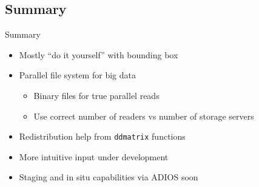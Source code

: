 \subsection{Summary}
\makesubcontentsslidessec


\begin{frame}
  \begin{block}{Summary}
    \begin{itemize}
    \item Mostly ``do it yourself'' with bounding box
    \item Parallel file system for big data
      \begin{itemize}
      \item Binary files for true parallel reads
      \item Use correct number of readers vs number of storage servers
      \end{itemize}
    \item Redistribution help from {\tt ddmatrix} functions
    \item More intuitive input under development
    \item Staging and in situ capabilities via ADIOS soon
    \end{itemize}
  \end{block}
\end{frame}